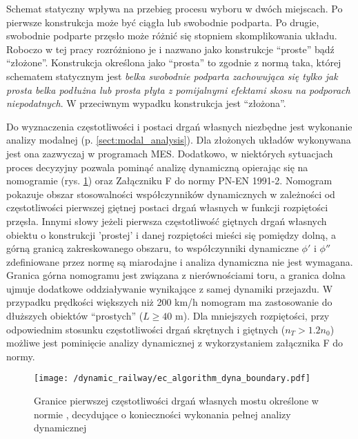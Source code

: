 Schemat statyczny wpływa na przebieg procesu wyboru w dwóch miejscach. Po pierwsze konstrukcja może być ciągła lub swobodnie podparta. Po drugie, swobodnie podparte przęsło może różnić się stopniem skomplikowania układu. Roboczo w tej pracy rozróżniono je i nazwano jako konstrukcje \enquote{proste} bądź \enquote{złożone}. Konstrukcja określona jako \enquote{prosta} to zgodnie z normą taka, której schematem statycznym jest \textit{belka swobodnie podparta zachowująca się tylko jak prosta belka podłużna lub prosta płyta z pomijalnymi efektami skosu na podporach niepodatnych}. W przeciwnym wypadku konstrukcja jest \enquote{złożona}.

Do wyznaczenia częstotliwości i postaci drgań własnych niezbędne jest wykonanie analizy modalnej (p. \ref{sect:modal_analysis}). Dla złożonych układów wykonywana jest ona zazwyczaj w programach MES. Dodatkowo, w niektórych sytuacjach proces decyzyjny pozwala pominąć analizę dynamiczną opierając się na nomogramie (rys. \ref{fig:ec_algorithm_dyna_boundary}) oraz Załączniku F do normy PN-EN 1991-2. Nomogram pokazuje obszar stosowalności współczynników dynamicznych w zależności od częstotliwości pierwszej giętnej postaci drgań własnych w funkcji rozpiętości przęsła. Innymi słowy jeżeli pierwsza częstotliwość giętnych drgań własnych obiektu o konstrukcji 'prostej' i danej rozpiętości mieści się pomiędzy dolną, a górną granicą zakreskowanego obszaru, to współczynniki dynamiczne $\phi '$ i $\phi ''$ zdefiniowane przez normę są miarodajne i analiza dynamiczna nie jest wymagana. Granica górna nomogramu jest związana z nierównościami toru, a granica dolna ujmuje dodatkowe oddziaływanie wynikające z samej dynamiki przejazdu. W przypadku prędkości większych niż 200 km/h nomogram ma zastosowanie do dłuższych obiektów \enquote{prostych} ($L\ge 40$ m). Dla mniejszych rozpiętości, przy odpowiednim stosunku częstotliwości drgań skrętnych i giętnych ($n_T>1.2n_0$) możliwe jest pominięcie analizy dynamicznej z wykorzystaniem załącznika F do normy. 
\begin{figure}[hbt!]
	\centering
	\texttt{[image: /dynamic\_railway/ec\_algorithm\_dyna\_boundary.pdf]} 
	\captionsetup{justification=centering}
	\caption{Granice pierwszej częstotliwości drgań własnych mostu określone w normie \cite{PKNj}, decydujące o konieczności wykonania pełnej analizy dynamicznej}
	\label{fig:ec_algorithm_dyna_boundary}
\end{figure}

